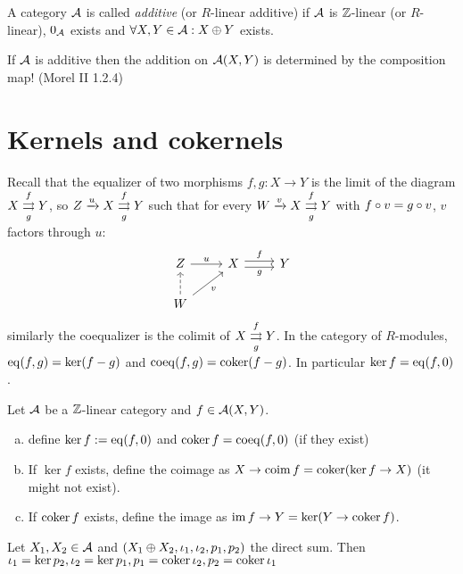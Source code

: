 \documentclass[a4paper]{report}
\begin{document}
\begin{defi}
A category $\mathcal{A}$ is called \emph{additive} (or $R$-linear additive) if $\mathcal{A}$ is $\mathbb{Z}$-linear (or $R$-linear), $0_{\mathcal{A}}$ exists and $\forall X, Y \in \mathcal{A}: X \oplus Y$ exists.
\end{defi}

\begin{rem*}
If $\mathcal{A}$ is additive then the addition on $\mathcal{A}(X,Y)$ is determined by the composition map! (Morel II 1.2.4)
\end{rem*}

\section{Kernels and cokernels}
Recall that the equalizer of two morphisms $f, g: X \to Y$ is the limit of the diagram $X \overunderset fg \rightrightarrows Y$, so $Z \xrightarrow u X\overunderset fg \rightrightarrows Y$ such that for every $W \xrightarrow v X \overunderset fg \rightrightarrows Y$ with $f \circ v = g \circ v$, $v$ factors through $u$:
\[\begin{tikzcd}
Z \arrow[r, "u"]                     & X \arrow[r, "f", shift left] \arrow[r, "g"', shift right] & Y \\
W \arrow[ru, "v"'] \arrow[u, dashed] &                                                           &
\end{tikzcd}\]similarly the coequalizer is the colimit of $X\overunderset fg \rightrightarrows Y$.
\newline
In the category of $R$-modules, $\operatorname{eq}(f,g) = \ker(f - g)$ and $\operatorname{coeq}(f,g) = \operatorname{coker}(f - g)$. In particular $\ker f = \operatorname{eq}(f,0)$.

\begin{defi}
  Let $\mathcal{A}$ be a $\mathbb{Z}$-linear category and $f \in \mathcal{A}(X,Y)$.
  \begin{enumerate}[(a)]
    \item define $\ker f := \operatorname{eq}(f,0)$ and $\operatorname{coker} f = \operatorname{coeq}(f,0)$ (if they exist)
    \item If $\ker f$ exists, define the coimage as $X \to \operatorname{coim} f = \operatorname{coker}(\ker f \to X)$ (it might not exist).
          \item If $\operatorname{coker} f$ exists, define the image as $\operatorname{im} f \to Y = \ker(Y \to \operatorname{coker} f)$.
  \end{enumerate}
\end{defi}

\begin{exmp}
Let $X_{1}, X_{2} \in \mathcal{A}$ and $(X_{1} \oplus X_{2}, \iota_{1}, \iota_{2}, p_{1}, p_{2})$ the direct sum. Then $\iota_{1} = \ker p_{2}, \iota_{2} = \ker p_{1}, p_{1} = \operatorname{coker} \iota_{2}, p_{2} = \operatorname{coker} \iota_{1}$
\end{exmp}
\end{document}
